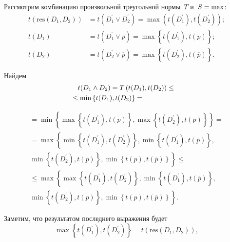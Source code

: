 \begin{multicols}{2}
  \smallskip
  
  Рассмотрим комбинацию произвольной треугольной нормы~$T$ 
и~$S\hm=\max$:
  \begin{align*}
  t\left( \mathrm{res}\left (D_1, D_2\right)\right) &=t\left( D_1^\prime \vee D_2^\prime\right) =\max \left( 
t(D_1^\prime), t(D_2^\prime)\right);\\
  t(D_1) &=t(D_1^\prime\vee p) =\max \left\{ t(D_1^\prime), t(p)\right\};\\
  t(D_2)&= t(D_2^\prime\vee \overline{p})=\max \left\{ t(D_2^\prime), 
t(\overline{p})\right\}.
  \end{align*}
  
  Найдем 
  \begin{multline*}
  t(D_1\wedge D_2) =T\left( t(D_1), t(D_2)\right) \leq {}\\
  \hspace*{-10mm}{}\leq \min\left\{ t(D_1), t(D_2)\right\}={}\hspace*{10mm}
  \end{multline*}

\noindent
  \begin{multline*}
  {}=
  \min\left\{ \max \left\{ t(D_1^\prime), t(p)\right\}, \max \left\{ t(D_2^\prime), 
t\left(\overline{p}\right)\right\}\right\}={}\\[1pt]
  {}=
  \max \left\{ \min\left\{ t(D_1^\prime), t(D_2^\prime)\right\}, 
  \min\left\{ t\left(D_1^\prime\right), t\left(\overline{p}\right)\right\},\right.\\[1pt]
 \left. \min\left\{ t(D_2^\prime), t(p)\right\},
  \min\left\{ t(p), t(\overline{p})\right\}\right\}\leq{}\\[1pt]
  {}\leq
  \max \left\{ \max \left\{ t(D_1^\prime), t(D_2^\prime)\right\}, \min\left\{ 
t(D_1^\prime), t(\overline{p})\right\},\right.\\[1pt]
\left.
  \min\left\{ t(D_2^\prime), t(p)\right\}, \min\left\{ t(p), 
t(\overline{p})\right\}\right\}.
  \end{multline*}
  
  
  Заметим, что результатом последнего выражения будет 
  $$
  \max \left\{ t\left(D_1^\prime\right), t\left(D_2^\prime\right)\right\}= t\left(\mathrm{res}\left( D_1, D_2\right)\right),
  $$
  
  \vspace*{-3pt}
  

\end{multicols}
